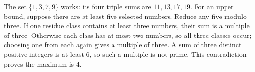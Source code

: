 The set $\{1,3,7,9\}$ works: its four triple sums are $11,13,17,19$. For an upper bound, suppose there are at least five selected numbers. Reduce any five modulo three. If one residue class contains at least three numbers, their sum is a multiple of three. Otherwise each class has at most two numbers, so all three classes occur; choosing one from each again gives a multiple of three. A sum of three distinct positive integers is at least $6$, so such a multiple is not prime. This contradiction proves the maximum is $\boxed4$.
